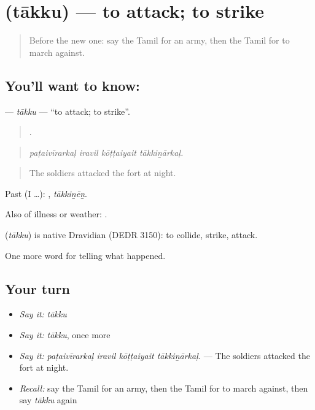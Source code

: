 \section[\texorpdfstring{\ta{தாக்கு} (tākku)}{தாக்கு (tākku)}]{ (tākku) — to attack; to strike}

\label{lesson:TA-C332-takku}



\begin{quote}
Before the new one: say the Tamil for an army, then the Tamil for to march against.
\end{quote}

\subsection*{You'll want to know: }
\textbf{} — \emph{tākku} — \textquotedblleft{}to attack; to strike\textquotedblright{}.

\begin{quote}
   .
\end{quote}

\begin{quote}
\emph{paṭaivīrarkaḷ iravil kōṭṭaiyait tākkiṉārkaḷ.}
\end{quote}

\begin{quote}
The soldiers attacked the fort at night.
\end{quote}

Past (I …): , \emph{tākkiṉēṉ}.

Also of illness or weather:   .

\begin{cousinweb}
\textbf{} (\emph{tākku}) is native Dravidian (DEDR 3150): to collide, strike, attack.
\end{cousinweb}

\begin{grammarlens}[title={What you've built}]
One more word for telling what happened.
\end{grammarlens}

\subsection*{Your turn}
\begin{itemize}
\raggedright
  \item \emph{Say it:} \emph{tākku}
  \item \emph{Say it:} \emph{tākku}, once more
  \item \emph{Say it:} \emph{paṭaivīrarkaḷ iravil kōṭṭaiyait tākkiṉārkaḷ.} — The soldiers attacked the fort at night.
  \item \emph{Recall:} say the Tamil for an army, then the Tamil for to march against, then say \emph{tākku} again
\end{itemize}

